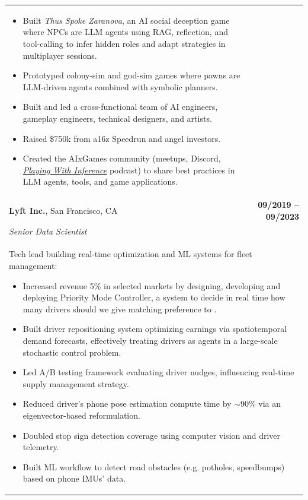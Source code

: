 \documentclass[a4paper,10pt]{article}
\begin{document}
\begin{tabularx}{\textwidth}{Xr}
{\begin{itemize}
\begin{itemize}
    \end{itemize}
  \item Built \emph{Thus Spoke Zaranova}, an AI social deception game where NPCs are LLM agents using RAG, reflection, and tool-calling to infer hidden roles and adapt strategies in multiplayer sessions.
  \item Prototyped colony-sim and god-sim games where pawns are LLM-driven agents combined with symbolic planners.
  \item Built and led a cross-functional team of AI engineers, gameplay engineers, technical designers, and artists.
  \item Raised \$750k from a16z Speedrun and angel investors.
  \item Created the AIxGames community (meetups, Discord, \href{https://www.youtube.com/@PlayingWithInference}{\emph{Playing With Inference}} podcast) to share best practices in LLM agents, tools, and game applications.
\end{itemize}
}\\


 {\bf{Lyft Inc.}}, San Francisco, CA & \bf{09/2019 -- 09/2023}\\
 \emph{Senior Data Scientist} &\\
 \multicolumn{2}{p{0.98\textwidth}}{
 Tech lead building real-time optimization and ML systems for fleet management:
 \begin{itemize}
 	\item Increased revenue 5\% in selected markets by designing, developing and deploying Priority Mode Controller, a system to decide in real time how many drivers should we give matching preference to \cite{krishnan2021solving}.
    \item Built driver repositioning system optimizing earnings via spatiotemporal demand forecasts, effectively treating drivers as agents in a large-scale stochastic control problem.
 	\item Led A/B testing framework evaluating driver nudges, influencing real-time supply management strategy.
 	\item Reduced driver's phone pose estimation compute time by $\sim$90\% via an eigenvector-based reformulation.
    \item Doubled stop sign detection coverage using computer vision and driver telemetry.
    \item Built ML workflow to detect road obstacles (e.g. potholes, speedbumps) based on phone IMUs' data.
 \end{itemize}
 }\\


\end{tabularx}
\end{document}
